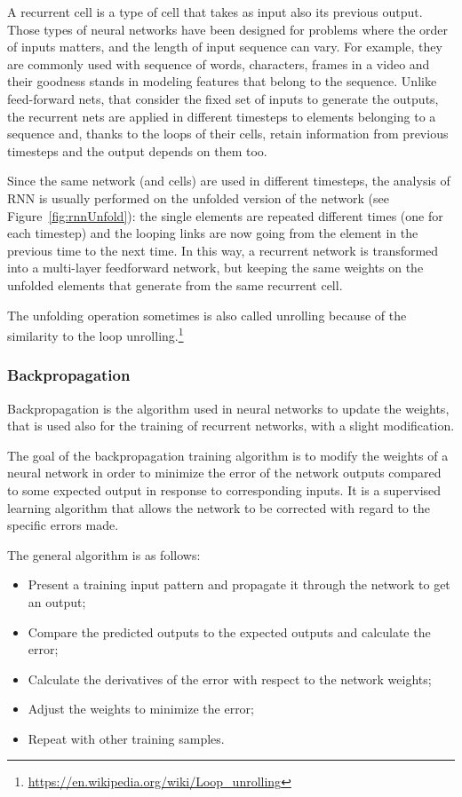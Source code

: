 A recurrent cell is a type of cell that takes as input also its previous output. Those types of neural networks have been designed for problems where the order of inputs matters, and the length of input sequence can vary. For example, they are commonly used with sequence of words, characters, frames in a video and their goodness stands in modeling features that belong to the sequence. Unlike feed-forward nets, that consider the fixed set of inputs to generate the outputs, the recurrent nets are applied in different timesteps to elements belonging to a sequence and, thanks to the loops of their cells, retain information from previous timesteps and the output depends on them too.

Since the same network (and cells) are used in different timesteps, the analysis of RNN is usually performed on the unfolded version of the network (see Figure~\ref{fig:rnnUnfold}): the single elements are repeated different times (one for each timestep) and the looping links are now going from the element in the previous time to the next time. In this way, a recurrent network is transformed into a multi-layer feedforward network, but keeping the same weights on the unfolded elements that generate from the same recurrent cell.

The unfolding operation sometimes is also called unrolling because of the similarity to the loop unrolling.\footnote{\url{https://en.wikipedia.org/wiki/Loop\_unrolling}}

\subsubsection{Backpropagation}
Backpropagation is the algorithm used in neural networks to update the weights, that is used also for the training of recurrent networks, with a slight modification.

The goal of the backpropagation training algorithm is to modify the weights of a neural network in order to minimize the error of the network outputs compared to some expected output in response to corresponding inputs. It is a supervised learning algorithm that allows the network to be corrected with regard to the specific errors made.

The general algorithm is as follows:

\begin{itemize}
	\item Present a training input pattern and propagate it through the network to get an output;

	\item Compare the predicted outputs to the expected outputs and calculate the error;

	\item Calculate the derivatives of the error with respect to the network weights;

	\item Adjust the weights to minimize the error;

	\item Repeat with other training samples.
\end{itemize}

